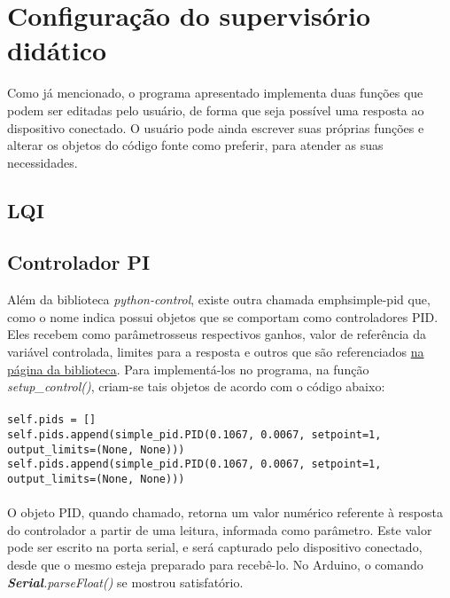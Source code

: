 \section{Configuração do supervisório didático}

Como já mencionado, o programa apresentado implementa duas funções que podem ser editadas pelo usuário, de forma que seja possível uma resposta ao dispositivo conectado. O usuário pode ainda escrever suas próprias funções e alterar os objetos do código fonte como preferir, para atender as suas necessidades. 

\subsection{LQI}

\subsection{Controlador PI}

Além da biblioteca \emph{python-control}, existe outra chamada emph{simple-pid} que, como o nome indica possui objetos que se comportam como controladores PID. Eles recebem como parâmetrosseus respectivos ganhos, valor de referência da variável controlada, limites para a resposta e outros que são referenciados  \href{https://pypi.org/project/simple-pid/}{na página da biblioteca}. Para implementá-los no programa, na função \emph{setup\_control()}, criam-se tais objetos de acordo com o código abaixo:
\\\\
\texttt{\footnotesize self.pids = [] \\
	self.pids.append(simple\_pid.PID(0.1067, 0.0067, setpoint=1, output\_limits=(None, None))) \\
	self.pids.append(simple\_pid.PID(0.1067, 0.0067, setpoint=1, output\_limits=(None, None)))}
\\\\
O objeto PID, quando chamado, retorna um valor numérico referente à resposta do controlador a partir de uma leitura, informada como parâmetro. Este valor pode ser escrito na porta serial, e será capturado pelo dispositivo conectado, desde que o mesmo esteja preparado para recebê-lo. No Arduino, o comando \emph{\textbf{Serial}.parseFloat()} se mostrou satisfatório.


